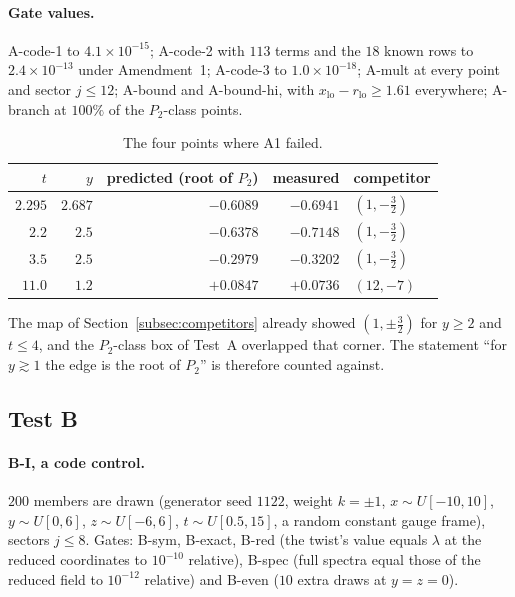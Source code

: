 \documentclass[11pt]{article}
\theoremstyle{definition}
\theoremstyle{remark}
\begin{document}
\paragraph{Gate values.} A-code-1 to $4.1\times10^{-15}$; A-code-2 with $113$ terms and the $18$ known rows to
$2.4\times10^{-13}$ under Amendment~1; A-code-3 to $1.0\times10^{-18}$; A-mult at every point and sector $j\le12$;
A-bound and A-bound-hi, with $x_{\mathrm{lo}}-r_{\mathrm{lo}}\ge1.61$ everywhere; A-branch at $100\%$ of the
$P_2$-class points.

\begin{table}[ht]\centering\small
\caption{The four points where A1 failed.}\label{tab:a1fail}
\begin{tabular}{rrrrl}\toprule
$t$ & $y$ & predicted (root of $P_2$) & measured & competitor\\\midrule
$2.295$ & $2.687$ & $-0.6089$ & $-0.6941$ & $(1,-\tfrac32)$\\
$2.2$ & $2.5$ & $-0.6378$ & $-0.7148$ & $(1,-\tfrac32)$\\
$3.5$ & $2.5$ & $-0.2979$ & $-0.3202$ & $(1,-\tfrac32)$\\
$11.0$ & $1.2$ & $+0.0847$ & $+0.0736$ & $(12,-7)$\\\bottomrule
\end{tabular}
\end{table}

The map of Section~\ref{subsec:competitors} already showed $(1,\pm\tfrac32)$ for $y\ge2$ and $t\le4$, and the $P_2$-class
box of Test~A overlapped that corner. The statement ``for $y\gtrsim1$ the edge is the root of $P_2$'' is therefore
counted against.

\subsection{Test B}

\paragraph{B-I, a code control.} $200$ members are drawn (generator seed $1122$, weight $k=\pm1$, $x\sim U[-10,10]$,
$y\sim U[0,6]$, $z\sim U[-6,6]$, $t\sim U[0.5,15]$, a random constant gauge frame), sectors $j\le8$. Gates: B-sym,
B-exact, B-red (the twist's value equals $\lambda$ at the reduced coordinates to $10^{-10}$ relative), B-spec (full
spectra equal those of the reduced field to $10^{-12}$ relative) and B-even ($10$ extra draws at $y=z=0$).
\end{document}
